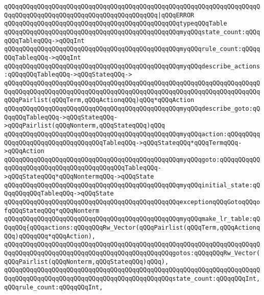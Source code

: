 \verb|qQQqqQQqqQQqqQQqqQQqqQQqqQQqqQQqqQQqqQQqqQQqqQQqqQQqqQQqqQQqqQQqqQQqqQQqqQQqqQQqqQQqqQQqqQQqqQQqqQQqqQQqqQQqqQQq|\verb#|qQQqERROR#\newline
\verb|qQQqqQQqqQQqqQQqqQQqqQQqqQQqqQQqqQQqqQQqqQQqqQQqtypeqQQqTable|\newline
\newline
\verb|qQQqqQQqqQQqqQQqqQQqqQQqqQQqqQQqqQQqqQQqqQQqqQQqmyqQQqstate_count:qQQqqQQqTableqQQq->qQQqInt|\newline
\verb|qQQqqQQqqQQqqQQqqQQqqQQqqQQqqQQqqQQqqQQqqQQqqQQqmyqQQqrule_count:qQQqqQQqTableqQQq->qQQqInt|\newline
\verb|qQQqqQQqqQQqqQQqqQQqqQQqqQQqqQQqqQQqqQQqqQQqqQQqmyqQQqdescribe_actions:qQQqqQQqTableqQQq->qQQqStateqQQq->|\newline
\verb|qQQqqQQqqQQqqQQqqQQqqQQqqQQqqQQqqQQqqQQqqQQqqQQqqQQqqQQqqQQqqQQqqQQqqQQqqQQqqQQqqQQqqQQqqQQqqQQqqQQqqQQqqQQqqQQqqQQqqQQqqQQqqQQqqQQqqQQqqQQqqQQqPairlist(qQQqTerm,qQQqActionqQQq)qQQq*qQQqAction|\newline
\verb|qQQqqQQqqQQqqQQqqQQqqQQqqQQqqQQqqQQqqQQqqQQqqQQqmyqQQqdescribe_goto:qQQqqQQqTableqQQq->qQQqStateqQQq->qQQqPairlist(qQQqNonterm,qQQqStateqQQq)qQQq|\newline
\verb|qQQqqQQqqQQqqQQqqQQqqQQqqQQqqQQqqQQqqQQqqQQqqQQqmyqQQqaction:qQQqqQQqqQQqqQQqqQQqqQQqqQQqqQQqqQQqTableqQQq->qQQqStateqQQq*qQQqTermqQQq->qQQqAction|\newline
\verb|qQQqqQQqqQQqqQQqqQQqqQQqqQQqqQQqqQQqqQQqqQQqqQQqmyqQQqgoto:qQQqqQQqqQQqqQQqqQQqqQQqqQQqqQQqqQQqqQQqqQQqTableqQQq->qQQqStateqQQq*qQQqNontermqQQq->qQQqState|\newline
\verb|qQQqqQQqqQQqqQQqqQQqqQQqqQQqqQQqqQQqqQQqqQQqqQQqmyqQQqinitial_state:qQQqqQQqqQQqTableqQQq->qQQqState|\newline
\newline
\verb|qQQqqQQqqQQqqQQqqQQqqQQqqQQqqQQqqQQqqQQqqQQqqQQqexceptionqQQqGotoqQQqofqQQqStateqQQq*qQQqNonterm|\newline
\newline
\verb|qQQqqQQqqQQqqQQqqQQqqQQqqQQqqQQqqQQqqQQqqQQqqQQqmyqQQqmake_lr_table:qQQqqQQq{qQQqactions:qQQqqQQqRw_Vector(qQQqPairlist(qQQqTerm,qQQqActionqQQq)qQQqqQQq*qQQqAction),|\newline
\verb|qQQqqQQqqQQqqQQqqQQqqQQqqQQqqQQqqQQqqQQqqQQqqQQqqQQqqQQqqQQqqQQqqQQqqQQqqQQqqQQqqQQqqQQqqQQqqQQqqQQqqQQqqQQqqQQqqQQqgotos:qQQqqQQqRw_Vector(qQQqPairlist(qQQqNonterm,qQQqStateqQQq)qQQq),|\newline
\verb|qQQqqQQqqQQqqQQqqQQqqQQqqQQqqQQqqQQqqQQqqQQqqQQqqQQqqQQqqQQqqQQqqQQqqQQqqQQqqQQqqQQqqQQqqQQqqQQqqQQqqQQqqQQqqQQqqQQqstate_count:qQQqqQQqInt,qQQqrule_count:qQQqqQQqInt,|\newline
